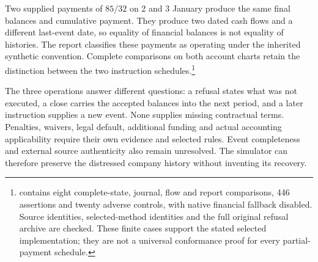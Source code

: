 Two supplied payments of $85/32$ on 2 and 3 January produce the same final balances and cumulative payment. They produce two dated cash flows and a different last-event date, so equality of financial balances is not equality of histories. The report classifies these payments as operating under the inherited synthetic convention. Complete comparisons on both account charts retain the distinction between the two instruction schedules.\footnote{ contains eight complete-state, journal, flow and report comparisons, 446 assertions and twenty adverse controls, with native financial fallback disabled. Source identities, selected-method identities and the full original refusal archive are checked. These finite cases support the stated selected implementation; they are not a universal conformance proof for every partial-payment schedule.}

The three operations answer different questions: a refusal states what was not executed, a close carries the accepted balances into the next period, and a later instruction supplies a new event. None supplies missing contractual terms. Penalties, waivers, legal default, additional funding and actual accounting applicability require their own evidence and selected rules. Event completeness and external source authenticity also remain unresolved. The simulator can therefore preserve the distressed company history without inventing its recovery.
